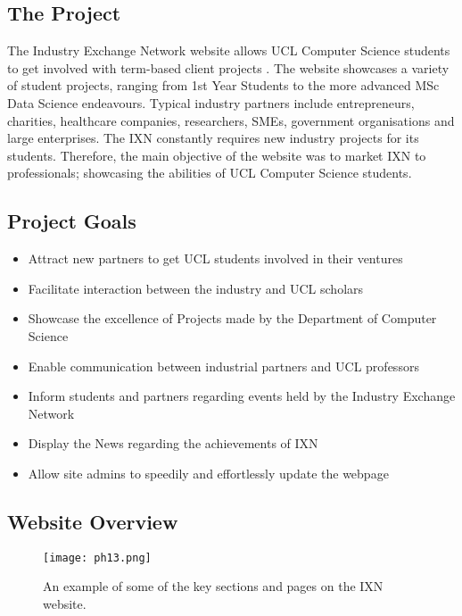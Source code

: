 \documentclass[fontsize=11pt]{extarticle}
\numberwithin{figure}{section} %
\numberwithin{table}{section}%
\begin{document}
\hypertarget{the-project}{%
\subsection{The Project}\label{the-project}}

The Industry Exchange Network website allows UCL Computer Science
students to get involved with term-based client projects \cite{g1}. The
website showcases a variety of student projects, ranging from 1st Year
Students to the more advanced MSc Data Science endeavours. Typical
industry partners include entrepreneurs, charities, healthcare
companies, researchers, SMEs, government organisations and large
enterprises. The IXN constantly requires new industry projects for its
students. Therefore, the main objective of the website was to market IXN
to professionals; showcasing the abilities of UCL Computer Science
students.

\hypertarget{project-goals}{%
\subsection{Project Goals}\label{project-goals}}

\begin{itemize}
\item
  Attract new partners to get UCL students involved in their ventures
\item
  Facilitate interaction between the industry and UCL scholars
\item
  Showcase the excellence of Projects made by the Department of Computer
  Science
\item
  Enable communication between industrial partners and UCL professors
\item
  Inform students and partners regarding events held by the Industry
  Exchange Network
\item
  Display the News regarding the achievements of IXN
\item
  Allow site admins to speedily and effortlessly update the webpage
\end{itemize}

\hypertarget{website-overview}{%
\subsection{Website Overview}\label{website-overview}}

\begin{figure}[H]
      \centering
      \texttt{[image: ph13.png]}
      \caption{An example of some of the key sections and pages on the IXN website.}
 \end{figure}
\end{document}

